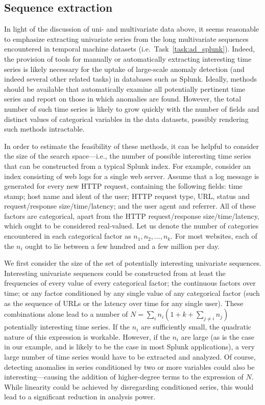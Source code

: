 \subsection{Sequence extraction}
\label{sect:series_mining}

In light of the discussion of uni- and multivariate data above, it seems reasonable to emphasize extracting univariate series from the long multivariate sequences encountered in temporal machine datasets (i.e.\ Task~\ref{task:ad_splunk}). Indeed, the provision of tools for manually or automatically extracting interesting time series is likely necessary for the uptake of large-scale anomaly detection (and indeed several other related tasks) in databases such as Splunk. Ideally, methods should be available that automatically examine all potentially pertinent time series and report on those in which anomalies are found. However, the total number of such time series is likely to grow quickly with the number of fields and distinct values of categorical variables in the data datasets, possibly rendering such methods intractable.

In order to estimate the feasibility of these methods, it can be helpful to consider the size of the search space---i.e.\@, the number of possible interesting time series that can be constructed from a typical Splunk index. For example, consider an index consisting of web logs for a single web server. Assume that a log message is generated for every new HTTP request, containing the following fields: time stamp; host name and ident of the user; HTTP request type, URL, status and request/response size/time/latency; and the user agent and referrer. All of these factors are categorical, apart from the HTTP request/response size/time/latency, which ought to be considered real-valued. Let us denote the number of categories encountered in each categorical factor as $n_1, n_2, \dots, n_k$. For most websites, each of the $n_i$ ought to lie between a few hundred and a few million per day.

We first consider the size of the set of potentially interesting univariate sequences. Interesting univariate sequences could be constructed from at least the frequencies of every value of every categorical factor; the continuous factors over time; or any factor conditioned by any single value of any categorical factor (such as the sequence of URLs or the latency over time for any single user). These combinations alone lead to a number of $N = \sum_i n_i (1 + k + \sum_{j \neq i} n_j)$ potentially interesting time series. If the $n_i$ are sufficiently small, the quadratic nature of this expression is workable. However, if the $n_i$ are large (as is the case in our example, and is likely to be the case in most Splunk applications), a very large number of time series would have to be extracted and analyzed. Of course, detecting anomalies in series conditioned by two or more variables could also be interesting---causing the addition of higher-degree terms to the expression of $N$. While linearity could be achieved by disregarding conditioned series, this would lead to a significant reduction in analysis power.

